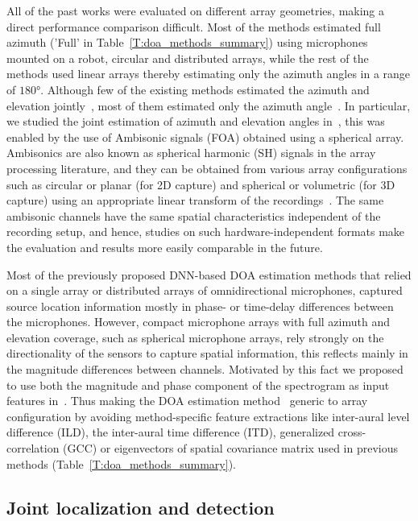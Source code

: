 \documentclass[journal]{IEEEtran}
\begin{document}
All of the past works were evaluated on different array geometries, making a direct performance comparison difficult. Most of the methods estimated full azimuth ('Full' in Table~\ref{T:doa_methods_summary}) using microphones mounted on a robot, circular and distributed arrays, while the rest of the methods used linear arrays thereby estimating only the azimuth angles in a range of $\ang{180}$. Although few of the existing methods estimated the azimuth and elevation jointly~\cite{Sun2017,Adavanne2018_EUSIPCO}, most of them estimated only the azimuth angle~\cite{Takeda2016_double, Xiao2015, Takeda2016_single, Chakrabarty2017, Chakrabarty2017_nips, Yalta2017, He2018,Hirvonen2015}. In particular, we studied the joint estimation of azimuth and elevation angles in~\cite{Adavanne2018_EUSIPCO}, this was enabled by the use of Ambisonic signals (FOA) obtained using a spherical array. Ambisonics are also known as spherical harmonic (SH) signals in the array processing literature, and they can be obtained from various array configurations such as circular or planar (for 2D capture) and spherical or volumetric (for 3D capture) using an appropriate linear transform of the recordings~\cite{teutsch2007modal}. The same ambisonic channels have the same spatial characteristics independent of the recording setup, and hence, studies on such hardware-independent formats make the evaluation and results more easily comparable in the future. 

Most of the previously proposed DNN-based DOA estimation methods that relied on a single array or distributed arrays of omnidirectional microphones, captured source location information mostly in phase- or time-delay differences between the microphones. However, compact microphone arrays with full azimuth and elevation coverage, such as spherical microphone arrays, rely strongly on the directionality of the sensors to capture spatial information, this reflects mainly in the magnitude differences between channels. Motivated by this fact we proposed to use both the magnitude and phase component of the spectrogram as input features in~\cite{Adavanne2018_EUSIPCO}. Thus making the DOA estimation method~\cite{Adavanne2018_EUSIPCO} generic to array configuration by avoiding method-specific feature extractions like inter-aural level difference (ILD), the inter-aural time difference (ITD), generalized cross-correlation (GCC) or eigenvectors of spatial covariance matrix used in previous methods (Table~\ref{T:doa_methods_summary}).

\subsection{Joint localization and detection}
\end{document}
